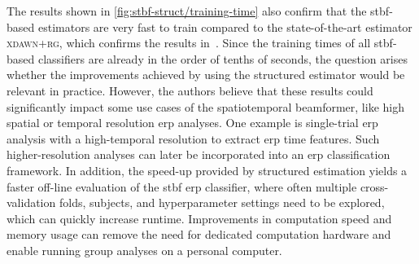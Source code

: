 	The results shown in \cref{fig:stbf-struct/training-time} also confirm that the
	\ac{stbf}-based estimators are very fast to train compared to the
	state-of-the-art estimator \textsc{xdawn+rg}, which confirms the results in~\cite{Wittevrongel2016}.
	Since the training times of all \ac{stbf}-based classifiers are already in
	the order of tenths of seconds, the question arises whether the
	improvements achieved by using the structured estimator would be relevant in
	practice.
	However, the authors believe that these results could significantly impact some
	use cases of the spatiotemporal beamformer, like high spatial or temporal resolution \ac{erp} analyses.
	One example is single-trial \ac{erp} analysis with a high-temporal
	resolution to extract \ac{erp} time features.
	Such higher-resolution analyses can later be incorporated into an \ac{erp}
	classification framework.
	In addition, the speed-up provided by structured estimation yields a faster
	off-line evaluation of the \ac{stbf} \ac{erp} classifier, where often multiple cross-validation folds, subjects, and hyperparameter settings need to be explored, which can quickly increase runtime.
	Improvements in computation speed and memory usage can remove the need for dedicated computation hardware and enable running group analyses on a personal computer.

